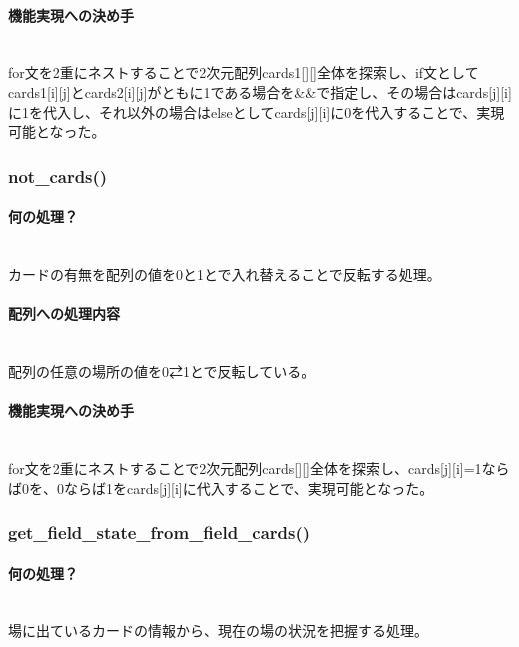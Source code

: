 \documentclass[11pt,a4paper, uplatex]{jsarticle}
\begin{document}
\paragraph{機能実現への決め手}\mbox{}\\
for文を2重にネストすることで2次元配列cards1[][]全体を探索し、if文としてcards1[i][j]とcards2[i][j]がともに1である場合を\&\&で指定し、その場合はcards[j][i]に1を代入し、それ以外の場合はelseとしてcards[j][i]に0を代入することで、実現可能となった。
%
\subsubsection{not\_cards()}
\paragraph{何の処理？}\mbox{}\\
カードの有無を配列の値を0と1とで入れ替えることで反転する処理。
\paragraph{配列への処理内容}\mbox{}\\
配列の任意の場所の値を0⇄1とで反転している。
\paragraph{機能実現への決め手}\mbox{}\\
for文を2重にネストすることで2次元配列cards[][]全体を探索し、cards[j][i]=1ならば0を、0ならば1をcards[j][i]に代入することで、実現可能となった。
%
\subsubsection{get\_field\_state\_from\_field\_cards()}
\paragraph{何の処理？}\mbox{}\\
場に出ているカードの情報から、現在の場の状況を把握する処理。
\end{document}
